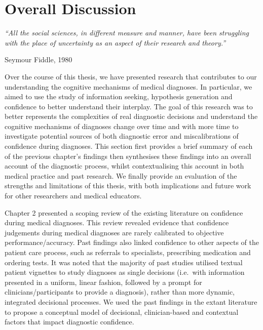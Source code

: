 \documentclass[a4paper, nobind]{templates/ociamthesis}
\begin{document}
\chapter{Overall Discussion}\label{chapter-7}

\adjustmtc
{}

\emph{``All the social sciences, in different measure and manner, have been struggling with the place of uncertainty as an aspect of their research and theory.''}

Seymour Fiddle, 1980

Over the course of this thesis, we have presented research that contributes to our understanding the cognitive mechanisms of medical diagnoses. In particular, we aimed to use the study of information seeking, hypothesis generation and confidence to better understand their interplay. The goal of this research was to better represents the complexities of real diagnostic decisions and understand the cognitive mechanisms of diagnoses change over time and with more time to investigate potential sources of both diagnostic error and miscalibrations of confidence during diagnoses. This section first provides a brief summary of each of the previous chapter's findings then synthesises these findings into an overall account of the diagnostic process, whilst contextualising this account in both medical practice and past research. We finally provide an evaluation of the strengths and limitations of this thesis, with both implications and future work for other researchers and medical educators.

Chapter 2 presented a scoping review of the existing literature on confidence during medical diagnoses. This review revealed evidence that confidence judgements during medical diagnoses are rarely calibrated to objective performance/accuracy. Past findings also linked confidence to other aspects of the patient care process, such as referrals to specialists, prescribing medication and ordering tests. It was noted that the majority of past studies utilised textual patient vignettes to study diagnoses as single decisions (i.e.~with information presented in a uniform, linear fashion, followed by a prompt for clinicians/participants to provide a diagnosis), rather than more dynamic, integrated decisional processes. We used the past findings in the extant literature to propose a conceptual model of decisional, clinician-based and contextual factors that impact diagnostic confidence.
\end{document}

